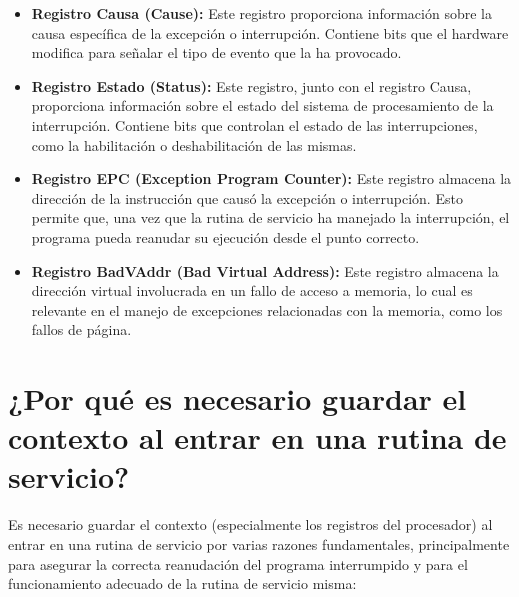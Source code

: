 \documentclass{article}
\begin{document}
\begin{itemize}[leftmargin=*, noitemsep]
    \item \textbf{Registro Causa (Cause):} 
    Este registro proporciona información sobre la causa específica de la excepción o interrupción. Contiene bits que el hardware modifica para señalar el tipo de evento que la ha provocado.
    
    \item \textbf{Registro Estado (Status):} 
    Este registro, junto con el registro Causa, proporciona información sobre el estado del sistema de procesamiento de la interrupción. Contiene bits que controlan el estado de las interrupciones, como la habilitación o deshabilitación de las mismas.
    
    \item \textbf{Registro EPC (Exception Program Counter):} 
    Este registro almacena la dirección de la instrucción que causó la excepción o interrupción. Esto permite que, una vez que la rutina de servicio ha manejado la interrupción, el programa pueda reanudar su ejecución desde el punto correcto.
    
    \item \textbf{Registro BadVAddr (Bad Virtual Address):} 
    Este registro almacena la dirección virtual involucrada en un fallo de acceso a memoria, lo cual es relevante en el manejo de excepciones relacionadas con la memoria, como los fallos de página.
\end{itemize}

\section{¿Por qué es necesario guardar el contexto al entrar en una rutina de servicio?}

Es necesario guardar el contexto (especialmente los registros del procesador) al entrar en una rutina de servicio por varias razones fundamentales, principalmente para asegurar la correcta reanudación del programa interrumpido y para el funcionamiento adecuado de la rutina de servicio misma:
\end{document}
